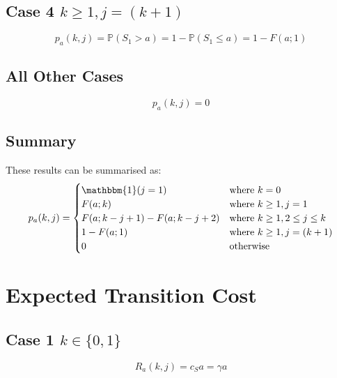 \subsection{Case 4 $k \geq 1, j = (k + 1)$}
\begin{equation*}
	p_{a} (k, j) = \mathbb{P} (S_{1} > a) = 1 - \mathbb{P} (S_{1} \leq a) = 1 - F (a; 1)
\end{equation*}

\subsection{All Other Cases}
\begin{equation*}
	p_{a} (k, j) = 0
\end{equation*}

\subsection{Summary}
These results can be summarised as:
\begin{equation}
	p_{a} (k, j) = \begin{cases}
		\mathbbm{1} (j = 1) & \text{where $k = 0$} \\
		F (a; k) & \text{where $k \geq 1, j = 1$} \\
		F (a; k - j + 1) - F (a; k - j + 2) & \text{where $k \geq 1, 2 \leq j \leq k$} \\
		1 - F (a; 1) & \text{where $k \geq 1, j = (k + 1)$} \\
		0 & \text{otherwise}
	\end{cases}
\end{equation}

\section{Expected Transition Cost}
\subsection{Case 1 $k \in \{ 0, 1 \}$}
\begin{equation*}
	R_{a} (k, j) = c_{S} a = \gamma a
\end{equation*}

